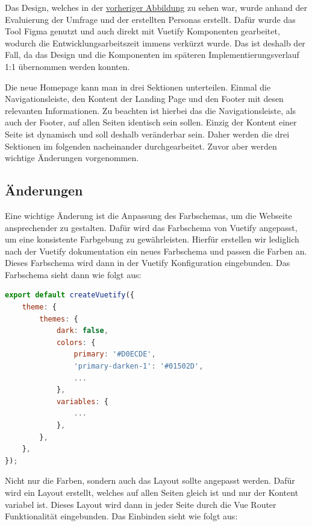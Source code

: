 Das Design, welches in der \hyperref[fig:new-co2runter-homepage-design]{vorheriger Abbildung} zu sehen war, wurde anhand der Evaluierung der Umfrage und der erstellten Personas erstellt.
Dafür wurde das Tool Figma genutzt und auch direkt mit Vuetify Komponenten gearbeitet, wodurch die Entwicklungsarbeitszeit immens verkürzt wurde.
Das ist deshalb der Fall, da das Design und die Komponenten im späteren Implementierungsverlauf 1:1 übernommen werden konnten.

Die neue Homepage kann man in drei Sektionen unterteilen.
Einmal die Navigationsleiste, den Kontent der Landing Page und den Footer mit desen relevanten Informationen.
Zu beachten ist hierbei das die Navigationsleiste, als auch der Footer, auf allen Seiten identisch sein sollen.
Einzig der Kontent einer Seite ist dynamisch und soll deshalb veränderbar sein.
Daher werden die drei Sektionen im folgenden nacheinander durchgearbeitet.
Zuvor aber werden wichtige Änderungen vorgenommen.

\subsection{Änderungen}

Eine wichtige Änderung ist die Anpassung des Farbschemas, um die Webseite ansprechender zu gestalten. Dafür wird das Farbschema von Vuetify angepasst, um eine konsistente Farbgebung zu gewährleisten. Hierfür erstellen wir lediglich nach der Vuetify dokumentation ein neues Farbschema und passen die Farben an. Dieses Farbschema wird dann in der Vuetify Konfiguration eingebunden. Das Farbschema sieht dann wie folgt aus: \cite{vuetiy-custom-color-theme}

\begin{lstlisting}[language={JavaScript}, caption={Vuetify Farbschema anpassung}]
export default createVuetify({
    theme: {
        themes: {
            dark: false,
            colors: {
                primary: '#D0ECDE',
                'primary-darken-1': '#01502D',
                ...
            },
            variables: {
                ...
            },
        },
    },
});
\end{lstlisting}

Nicht nur die Farben, sondern auch das Layout sollte angepasst werden.
Dafür wird ein Layout erstellt, welches auf allen Seiten gleich ist und nur der Kontent variabel ist.
Dieses Layout wird dann in jeder Seite durch die Vue Router Funktionalität eingebunden.
Das Einbinden sieht wie folgt aus:

